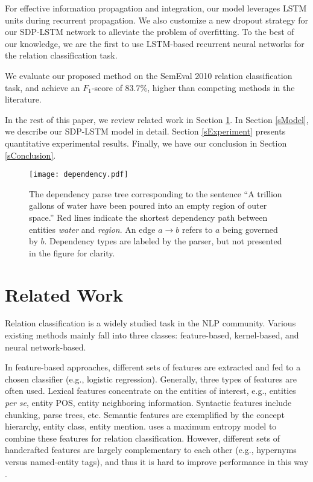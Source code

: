 \documentclass[11pt,a4paper]{article}
\begin{document}
For effective information propagation and integration,
our model leverages LSTM units during recurrent propagation.
We also customize a new dropout strategy
for our SDP-LSTM network to alleviate the problem of overfitting.
To the best of our knowledge, we are the first to use
LSTM-based recurrent neural networks for the relation classification task.

We evaluate our proposed method on the SemEval
2010 relation classification task,
and achieve an $F_1$-score of 83.7\%, higher than
competing methods in the literature.

In the rest of this paper, we 
review related work in Section \ref{sRelatedwork}.
In Section \ref{sModel}, we describe our SDP-LSTM model in detail.
Section \ref{sExperiment} presents quantitative experimental results.
Finally, we have our conclusion in Section \ref{sConclusion}.



\begin{figure}[!t]
\centering
\texttt{[image: dependency.pdf]}
\caption{The dependency parse tree corresponding to the sentence
``A trillion gallons of water have been poured
into an empty region of outer space.'' Red lines indicate the shortest dependency path
 between entities \textit{water} and \textit{region}. 
 An edge $a\rightarrow b$ refers to $a$ being governed by $b$. 
 Dependency types are labeled by the parser, but not presented in the figure for clarity.}\label{fDependency}
\end{figure}

\section{Related Work}\label{sRelatedwork}

Relation classification is a widely studied task in the NLP community.
Various existing methods mainly fall into three classes:
feature-based, kernel-based, and neural network-based.

In feature-based approaches,
different sets of features are extracted
and fed to a chosen classifier (e.g., logistic regression).
Generally, three types of features are often used.
Lexical features concentrate on the entities of interest,
e.g., entities \textit{per se}, entity POS,
entity neighboring information.
Syntactic features include chunking, parse trees, etc.
Semantic features are exemplified by
the concept hierarchy, entity class, entity mention.
 uses a maximum entropy model
to combine these features for relation classification.
However, different sets of handcrafted features are largely complementary to each other
(e.g., hypernyms versus named-entity tags),
and thus it is hard to improve performance in this way \cite{REknowledge}.
\end{document}
